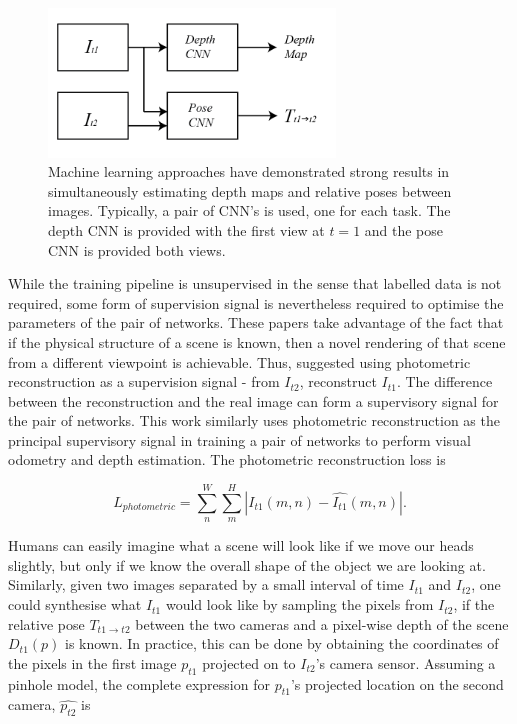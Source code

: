 \documentclass[openany]{book}
\begin{document}
\begin{figure}[htbp]
    \centering
    \includegraphics[width=3in]{images/cnns.png}
    \caption{Machine learning approaches have demonstrated strong results in simultaneously estimating depth maps and relative poses between images. Typically, a pair of CNN's is used, one for each task. The depth CNN is provided with the first view at $t=1$ and the pose CNN is provided both views.}
    \label{2cnns}
\end{figure}


While the training pipeline is unsupervised in the sense that labelled data is not required, some form of supervision signal is nevertheless required to optimise the parameters of the pair of networks. These papers take advantage of the fact that if the physical structure of a scene is known, then a novel rendering of that scene from a different viewpoint is achievable. Thus, \cite{garg2016unsupervised} suggested using photometric reconstruction as a supervision signal - from $I_{t2}$, reconstruct $I_{t1}$. The difference between the reconstruction and the real image can form a supervisory signal for the pair of networks. This work similarly uses photometric reconstruction as the principal supervisory signal in training a pair of networks to perform visual odometry and depth estimation. The photometric reconstruction loss is


\begin{equation}
    L_{photometric} = \sum_n^W \sum_m^H |I_{t1}(m,n) - \hat{I_{t1}}(m,n)|.
    \label{photometricloss}
\end{equation}


Humans can easily imagine what a scene will look like if we move our heads slightly, but only if we know the overall shape of the object we are looking at. Similarly, given two images separated by a small interval of time $I_{t1}$ and $I_{t2}$, one could synthesise what $I_{t1}$ would look like by sampling the pixels from $I_{t2}$, if the relative pose $T_{t1\rightarrow t2}$ between the two cameras and a pixel-wise depth of the scene $D_{t1}(p)$ is known. In practice, this can be done by obtaining the coordinates of the pixels in the first image $p_{t1}$ projected on to $I_{t2}$'s camera sensor. Assuming a pinhole model, the complete expression for $p_{t1}$'s projected location on the second camera, $\hat{p_{t2}}$ is 
\end{document}
